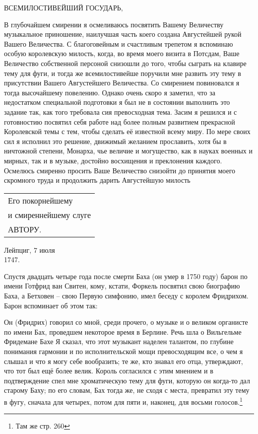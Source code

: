 \documentclass[../main.tex]{subfiles}
\begin{document}
\medskip
\begin{adjustwidth}{\parindent}{}
%
ВСЕМИЛОСТИВЕЙШИЙ ГОСУДАРЬ,

\medskip\noindent
В глубочайшем смирении я осмеливаюсь посвятить Вашему Величеству музыкальное приношение, наилучшая часть коего создана Августейшей рукой Вашего Величества. С благоговейным и счастливым трепетом я вспоминаю особую королевскую милость, когда, во время моего визита в Потсдам, Ваше Величество собственной персоной снизошли до того, чтобы сыграть на клавире тему для фуги, и тогда же всемилостивейше поручили мне развить эту тему в присутствии Вашего Августейшего Величества. Со смирением повиновался я тогда высочайшему повелению. Однако очень скоро я заметил, что за недостатком специальной подготовки я был не в состоянии выполнить это задание так, как того требовала сия превосходная тема. Засим я решился и с готовностию посвятил себя работе над более полным развитием прекрасной Королевской темы с тем, чтобы сделать её известной всему миру. По мере своих сил я исполнил это решение, движимый желанием прославить, хотя бы в ничтожной степени, Монарха, чье величие и могущество, как в науках военных и мирных, так и в музыке, достойно восхищения и преклонения каждого. Осмелюсь смиренно просить Ваше Величество снизойти до принятия моего скромного труда и продолжить дарить Августейшую милость

\null\hfill\begin{tabular}{@{} p{} @{}}
    Его покорнейшему \\
    \quad и смиреннейшему слуге \\
    \qquad АВТОРУ.
\end{tabular}

\noindent
Лейпциг, 7 июля \\
1747.
%
\end{adjustwidth}
\medskip

Спустя двадцать четыре года после смерти Баха (он умер в 1750 году) барон по имени Готфрид ван Свитен, кому, кстати, Форкель посвятил свою биографию Баха, а Бетховен \--- свою Первую симфонию, имел беседу с королем Фридрихом. Барон вспоминает об этом так:

\smallskip
\begin{adjustwidth}{\parindent}{}
\noindent
Он (Фридрих) говорил со мной, среди прочего, о музыке и о великом органисте по имени Бах, проведшем некоторое время в Берлине. Речь шла о Вильгельме Фридемане Бахе Я сказал, что этот музыкант наделен талантом, по глубине понимания гармонии и по исполнительской мощи превосходящим все, о чем я слышал и что я могу себе вообразить; те же, кто знавал его отца, утверждают, что тот был ещё более велик. Король согласился с этим мнением и в подтверждение спел мне хроматическую тему для фуги, которую он когда-то дал старому Баху; по его словам, Бах тогда же, не сходя с места, превратил эту тему в фугу, сначала для четырех, потом для пяти и, наконец, для восьми голосов.\footnote{Там же стр. 260}
\end{adjustwidth}
\smallskip
\end{document}
